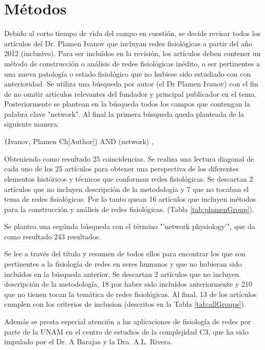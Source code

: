 \documentclass[twoside,twocolumn]{article}
\begin{document}
\section{Métodos}
Debido al corto tiempo de vida del campo en cuestión, se decide revisar todos los artículos del Dr. Plamen Ivanov que incluyan redes fisiológicas a partir del año 2012 (inclusivo).
Para ser incluídos en la revisión, los artículos deben contener un método de construcción o análisis de redes fisiológicas inédito, o ser pertinentes a una nueva patología o estado fisiológico que no hubiese sido estudiado con con anterioridad.
Se utiliza una búsqueda por autor (el Dr Plamen Ivanov) con el fin de no omitir artículos relevantes del fundador y principal publicador en el tema. Posteriormente se plantean en la búsqueda todos los campos que contengan la palabra clave "network". Al final la primera búsqueda queda planteada de la siguiente manera:

\texttt(Ivanov, Plamen Ch[Author]) AND (network) ,

Obteniendo como resultado 25 coincidencias. Se realiza una lectura diagonal de cada uno de los 25 artículos para obtener una perspectiva de los diferentes elementos históricos y técnicos que conforman redes fisiológicas.
Se descartan 2 artículos que no incluyen descripción de la metodología y 7 que no tocaban el tema de redes fisiológicas. Por lo tanto quean 16 artículos que incluyen métodos para la construcción y análisis de redes fisiológicas. (Tabla \ref{tab:plamenGroup}).

Se plantea una segúnda búsqueda con el término "'network physiology'", que da como resultado 243 resultados.

Se lee a través del título y resumen de todos ellos para  encontrar los que son pertinentes a la fisiología de redes en seres humanos y que no hubieran sido incluídos en la búsqueda anterior.
Se descartan 2 artículos que no incluyen descripción de la metodología, 18 por haber sido incluídos anteriormente y 210 que no tienen tocan la temática de redes fisiológicas.
Al final, 13 de los artículos cumplen con los criterios de inclusion (descritos en la Tabla \ref{tab:allGroups}).

Además se presta especial atención a las aplicaciones de fisiología de redes por parte de la UNAM en el centro de estudios de la complejidad C3, que ha sido impulado por el Dr. A Barajas y la Dra. A.L. Rivera.
\end{document}
